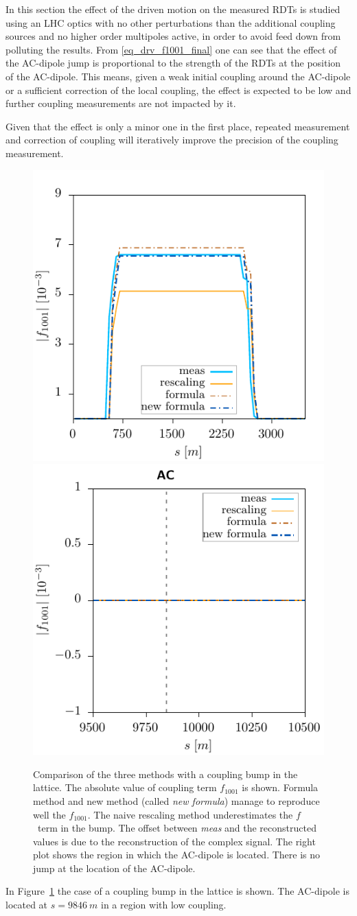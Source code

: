 In this section the effect of the driven motion on the measured RDTs is studied using an LHC optics with no other
perturbations than the additional coupling sources and no higher order multipoles active, in order to avoid feed
down from polluting the results.
From \eqref{eq_drv_f1001_final} one can see that the effect of the AC-dipole jump is proportional to
the strength of the RDTs at the  position of the AC-dipole.
This means, given a weak initial coupling around the AC-dipole or a sufficient
correction of the local coupling, the effect is expected to be low and further coupling measurements
are not impacted by it. 

Given that the effect is only a minor one in the first place, repeated measurement and correction of
coupling will iteratively improve the precision of the coupling measurement.
%
\begin{figure}[h]
  \centering
  \includegraphics[width=.49\linewidth]{forcedcoupling/ac_outside_closed_bump}
  \includegraphics[width=.49\linewidth]{forcedcoupling/ac_outside_closed_bump_at_loc}
  \caption{Comparison of the three methods with a coupling bump in the lattice.
    The absolute value of coupling term $f_{1001}$ is shown.
    Formula method and new method (called \emph{new formula}) manage to reproduce well the $f_{1001}$.
    The naive rescaling method underestimates the $f$~term in the bump.
    The offset between \emph{meas} and the reconstructed values is due to the reconstruction
    of the complex signal.
    The right plot shows the region in which the AC-dipole is located.
    There is no jump at the location of the AC-dipole.
  }
  \label{fig_comp_felix_ryo_ac_outside}
\end{figure}
%
In Figure~\ref{fig_comp_felix_ryo_ac_outside} the case of a coupling bump in the lattice is shown.
The AC-dipole is located at $s=\SI{9846}{m}$ in a region with low coupling.

